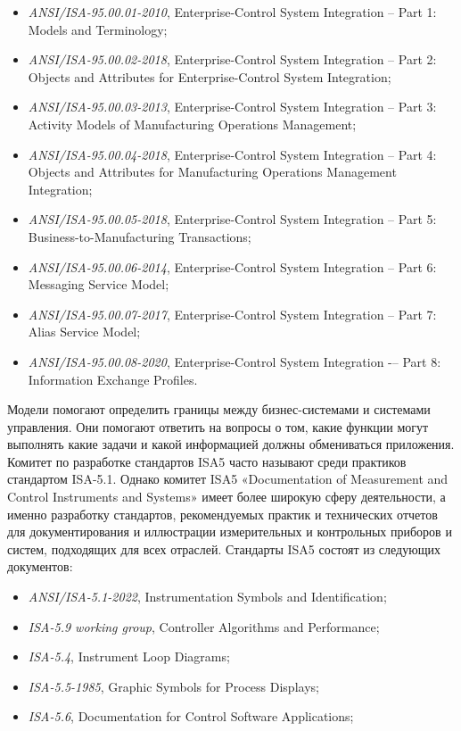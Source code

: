 \begin{itemize}
    \item \textit {ANSI/ISA-95.00.01-2010}, Enterprise-Control System Integration -- Part 1: Models and Terminology;
    \item \textit {ANSI/ISA-95.00.02-2018}, Enterprise-Control System Integration -- Part 2: Objects and Attributes for Enterprise-Control System Integration;
    \item \textit {ANSI/ISA-95.00.03-2013}, Enterprise-Control System Integration -- Part 3: Activity Models of Manufacturing Operations Management;
    \item \textit {ANSI/ISA-95.00.04-2018}, Enterprise-Control System Integration -- Part 4: Objects and Attributes for Manufacturing Operations Management Integration;
    \item \textit {ANSI/ISA-95.00.05-2018}, Enterprise-Control System Integration -- Part 5: Business-to-Manufacturing Transactions;
    \item \textit {ANSI/ISA-95.00.06-2014}, Enterprise-Control System Integration -- Part 6: Messaging Service Model;
    \item \textit {ANSI/ISA-95.00.07-2017}, Enterprise-Control System Integration -- Part 7: Alias Service Model;
    \item \textit {ANSI/ISA-95.00.08-2020}, Enterprise-Control System Integration -– Part 8: Information Exchange Profiles.
\end{itemize}

Модели помогают определить границы между бизнес-системами и системами управления. Они помогают ответить на вопросы о том, какие функции могут выполнять какие задачи и какой информацией должны обмениваться приложения. Комитет по разработке стандартов ISA5 часто называют среди практиков стандартом ISA-5.1. Однако комитет ISA5 «Documentation of Measurement and Control Instruments and Systems» имеет более широкую сферу деятельности, а именно разработку стандартов, рекомендуемых практик и технических отчетов для документирования и иллюстрации измерительных и контрольных приборов и систем, подходящих для всех отраслей. Стандарты ISA5 состоят из следующих документов:

\begin{itemize}
    \item \textit {ANSI/ISA-5.1-2022}, Instrumentation Symbols and Identification;
    \item \textit {ISA-5.9 working group}, Controller Algorithms and Performance;
    \item \textit {ISA-5.4}, Instrument Loop Diagrams;
    \item \textit {ISA-5.5-1985}, Graphic Symbols for Process Displays;
    \item \textit {ISA-5.6}, Documentation for Control Software Applications;
\end{itemize}

